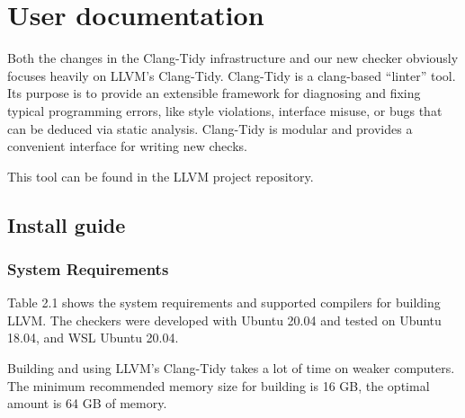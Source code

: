 \chapter{User documentation}
\label{ch:user}

Both the changes in the Clang-Tidy infrastructure and our new checker obviously focuses heavily on LLVM's Clang-Tidy.
Clang-Tidy is a clang-based \CC{} “linter” tool. Its purpose is to provide an extensible framework for diagnosing and fixing
typical programming errors, like style violations, interface misuse, or bugs that can be deduced via static analysis.
Clang-Tidy is modular and provides a convenient interface for writing new checks. %

This tool can be found in the LLVM project repository. %

\section{Install guide}

\subsection{System Requirements}

Table 2.1 shows the system requirements and supported compilers for building
LLVM. The checkers were developed with Ubuntu 20.04 and tested on Ubuntu 18.04, and WSL Ubuntu 20.04.

Building and using LLVM's Clang-Tidy takes a lot of time on weaker computers. The minimum recommended memory size
for building is 16 GB, the optimal amount is 64 GB of memory. %

